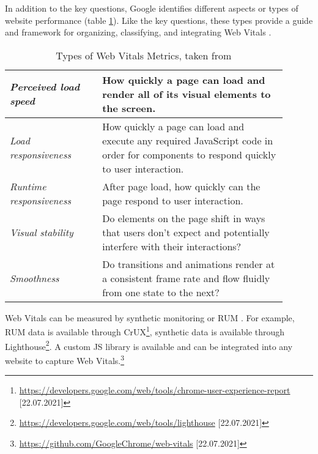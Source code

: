 
In addition to the key questions, Google identifies different aspects or types of website performance (table \ref{table:web_vitals_types}).
Like the key questions, these types provide a guide and framework for organizing, classifying, and integrating Web Vitals \cite{2019WaltonUserCentric}.


\begin{table}[h]
	\small
	\centering
	\begin{tabular}{ | p{0.3\linewidth} | p{0.6\linewidth} | }
	\hline
	\textit{Perceived load speed} & How quickly a page can load and render all of its visual elements to the screen. \\
	\hline
	\textit{Load responsiveness} & How quickly a page can load and execute any required JavaScript code in order for components to respond quickly to user interaction. \\
	\hline
	\textit{Runtime responsiveness} & After page load, how quickly can the page respond to user interaction. \\
	\hline
	\textit{Visual stability} & Do elements on the page shift in ways that users don't expect and potentially interfere with their interactions? \\
	\hline
	\textit{Smoothness} & Do transitions and animations render at a consistent frame rate and flow fluidly from one state to the next? \\
	\hline
	\end{tabular}
	\medskip
	\caption[Types of Web Vitals Metrics]{Types of Web Vitals Metrics, taken from \cite{2019WaltonUserCentric}}
	\label{table:web_vitals_types}
\end{table}



Web Vitals can be measured by synthetic monitoring or RUM \cite{2019WaltonUserCentric}.
For example, RUM data is available through CrUX\footnote{\url{https://developers.google.com/web/tools/chrome-user-experience-report} [22.07.2021]}, synthetic data is available through Lighthouse\footnote{\url{https://developers.google.com/web/tools/lighthouse} [22.07.2021]}.
A custom JS library is available and can be integrated into any website to capture Web Vitals.\footnote{\url{https://github.com/GoogleChrome/web-vitals} [22.07.2021]}


